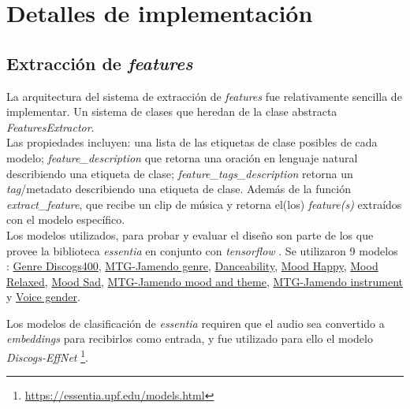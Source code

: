 \section{Detalles de implementación}
\label{sec:implementation}
\subsection{Extracción de \textit{features}}
\label{subsec:essentia}
La arquitectura del sistema de extracción de \textit{features} fue relativamente sencilla de implementar. Un sistema de clases que heredan de la clase abstracta \textit{FeaturesExtractor}. \\
Las propiedades incluyen: una lista de las etiquetas de clase posibles de cada modelo; \textit{feature\_description} que retorna una oración en lenguaje natural describiendo una etiqueta de clase; \textit{feature\_tags\_description} retorna un \textit{tag}/metadato describiendo una etiqueta de clase. Además de la función \textit{extract\_feature}, que recibe un clip de música y retorna el(los) \textit{feature(s)} extraídos con el modelo específico. \\
Los modelos utilizados, para probar y evaluar el diseño son parte de los que provee la biblioteca \textit{essentia} en conjunto con \textit{tensorflow} \cite{alonso2020tensorflow}. Se utilizaron 9 modelos : \href{https://essentia.upf.edu/models.html#genre-discogs400}{Genre Discogs400}, \href{https://essentia.upf.edu/models.html#mtg-jamendo-genre}{MTG-Jamendo genre},  \href{https://essentia.upf.edu/models.html#danceability}{Danceability}, \href{https://essentia.upf.edu/models.html#mood-happy}{Mood Happy}, \href{https://essentia.upf.edu/models.html#mood-relaxed}{Mood Relaxed}, \href{https://essentia.upf.edu/models.html#mood-sad}{Mood Sad}, \href{https://essentia.upf.edu/models.html#mtg-jamendo-mood-and-theme}{MTG-Jamendo mood and theme}, \href{https://essentia.upf.edu/models.html#mtg-jamendo-instrument}{MTG-Jamendo instrument} y \href{https://essentia.upf.edu/models.html#voice-gender}{Voice gender}.

Los modelos de clasificación de \textit{essentia} requiren que el audio sea convertido a \textit{embeddings} para recibirlos como entrada, y fue utilizado para ello el modelo \textit{Discogs-EffNet} \footnote{\href{https://essentia.upf.edu/models.html}{https://essentia.upf.edu/models.html}}.

